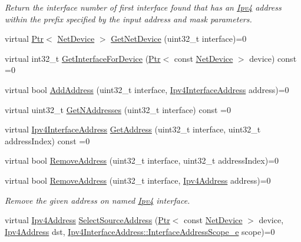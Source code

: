 \begin{DoxyCompactItemize}
\begin{DoxyCompactList}\small\item\em Return the interface number of first interface found that has an \hyperlink{classns3_1_1Ipv4}{Ipv4} address within the prefix specified by the input address and mask parameters. \end{DoxyCompactList}\item 
virtual \hyperlink{classns3_1_1Ptr}{Ptr}$<$ \hyperlink{classns3_1_1NetDevice}{Net\+Device} $>$ \hyperlink{classns3_1_1Ipv4_a3dc128ddb3012e2b27c005d88bc9f695}{Get\+Net\+Device} (uint32\+\_\+t interface)=0
\item 
virtual int32\+\_\+t \hyperlink{classns3_1_1Ipv4_ab3ff69819c27af58b02ee4791c94abf7}{Get\+Interface\+For\+Device} (\hyperlink{classns3_1_1Ptr}{Ptr}$<$ const \hyperlink{classns3_1_1NetDevice}{Net\+Device} $>$ device) const =0
\item 
virtual bool \hyperlink{classns3_1_1Ipv4_ad203526cae6a4b86f1bb89e44d2b62f7}{Add\+Address} (uint32\+\_\+t interface, \hyperlink{classns3_1_1Ipv4InterfaceAddress}{Ipv4\+Interface\+Address} address)=0
\item 
virtual uint32\+\_\+t \hyperlink{classns3_1_1Ipv4_a4de4613f0d5e34eeddd84e81c25768ca}{Get\+N\+Addresses} (uint32\+\_\+t interface) const =0
\item 
virtual \hyperlink{classns3_1_1Ipv4InterfaceAddress}{Ipv4\+Interface\+Address} \hyperlink{classns3_1_1Ipv4_a5aa7213c1365083840b2311a3cb5b24b}{Get\+Address} (uint32\+\_\+t interface, uint32\+\_\+t address\+Index) const =0
\item 
virtual bool \hyperlink{classns3_1_1Ipv4_acc40c575c9eda827a041c5f99fe63401}{Remove\+Address} (uint32\+\_\+t interface, uint32\+\_\+t address\+Index)=0
\item 
virtual bool \hyperlink{classns3_1_1Ipv4_a5570da6ab4231f74efcb8c101c2346a0}{Remove\+Address} (uint32\+\_\+t interface, \hyperlink{classns3_1_1Ipv4Address}{Ipv4\+Address} address)=0
\begin{DoxyCompactList}\small\item\em Remove the given address on named \hyperlink{classns3_1_1Ipv4}{Ipv4} interface. \end{DoxyCompactList}\item 
virtual \hyperlink{classns3_1_1Ipv4Address}{Ipv4\+Address} \hyperlink{classns3_1_1Ipv4_a78f954ad686942a98d456a3dd5d418e5}{Select\+Source\+Address} (\hyperlink{classns3_1_1Ptr}{Ptr}$<$ const \hyperlink{classns3_1_1NetDevice}{Net\+Device} $>$ device, \hyperlink{classns3_1_1Ipv4Address}{Ipv4\+Address} dst, \hyperlink{classns3_1_1Ipv4InterfaceAddress_a329cea433e74f717c26c9e51c4fcd3d8}{Ipv4\+Interface\+Address\+::\+Interface\+Address\+Scope\+\_\+e} scope)=0

\end{DoxyCompactItemize}
